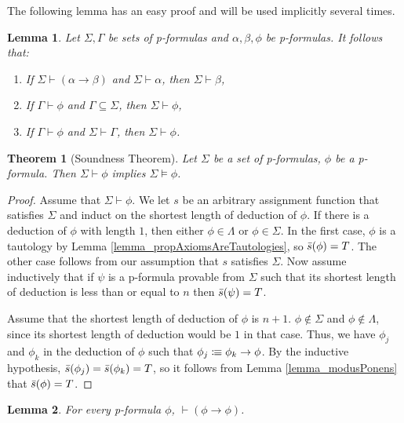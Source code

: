 \documentclass[leqno]{article}
\newtheorem{theorem}{Theorem}[section]
\newtheorem{lemma}{Lemma}[section]
\newcommand{\proves}{\vdash}
\newcommand{\is}{\colonequiv}
\newcommand{\limplies}{\rightarrow}
\begin{document}
The following lemma has an easy proof and will be used implicitly several times.
\begin{lemma}
    Let $\Sigma, \Gamma$ be sets of p-formulas and $\alpha, \beta, \phi$ be p-formulas. It follows that:
    \begin{enumerate}
        \item If $\Sigma \proves (\alpha \limplies \beta)$ and $\Sigma \proves \alpha$, then $\Sigma \proves \beta$,
    
        \item If $\Gamma \proves \phi$ and $\Gamma \subseteq \Sigma$, then $\Sigma \proves \phi$,
        
        \item If $\Gamma \proves \phi$ and $\Sigma \proves \Gamma$, then $\Sigma \proves \phi$.
    \end{enumerate}
\end{lemma}

\begin{theorem} [Soundness Theorem]
    Let $\Sigma$ be a set of p-formulas, $\phi$ be a p-formula. Then $\Sigma \proves \phi$ implies $\Sigma \models \phi$.
\end{theorem}

\begin{proof}
     Assume that $\Sigma \proves \phi$. We let $s$ be an arbitrary assignment function that satisfies $\Sigma$ and induct on the shortest length of deduction of $\phi$. If there is a deduction of $\phi$ with length $1$, then either $\phi \in \Lambda$ or $\phi \in \Sigma$. In the first case, $\phi$ is a tautology by Lemma \ref{lemma_propAxiomsAreTautologies}, so $\Bar{s}(\phi) = T$. The other case follows from our assumption that $s$ satisfies $\Sigma$. Now assume inductively that if $\psi$ is a p-formula provable from $\Sigma$ such that its shortest length of deduction is less than or equal to $n$ then $\Bar{s}(\psi) = T$.
     
     Assume that the shortest length of deduction of $\phi$ is $n+1$. $\phi \notin \Sigma$ and $\phi \notin \Lambda$, since its shortest length of deduction would be $1$ in that case. Thus, we have $\phi_j$ and $\phi_k$ in the deduction of $\phi$ such that $\phi_j \is \phi_k \limplies \phi$. By the inductive hypothesis, $\Bar{s}(\phi_j) = \Bar{s}(\phi_k) = T$, so it follows from Lemma \ref{lemma_modusPonens} that $\Bar{s}(\phi) = T$. 
\end{proof}

\begin{lemma} \label{lem_selfImplication}
    For every p-formula $\phi$, $\proves (\phi \limplies \phi)$.
\end{lemma}
\end{document}
